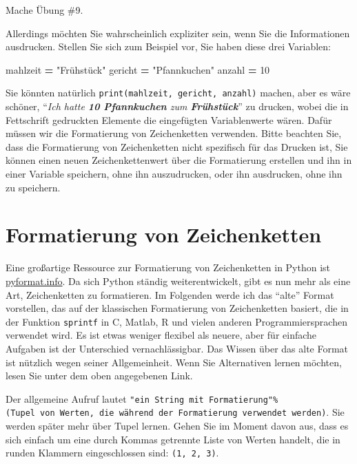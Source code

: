 \documentclass[
]{book}
\newenvironment{Shaded}{\begin{snugshade}}{\end{snugshade}}
\newcommand{\DecValTok}[1]{\textcolor[rgb]{0.00,0.00,0.81}{#1}}
\newcommand{\NormalTok}[1]{#1}
\newcommand{\OperatorTok}[1]{\textcolor[rgb]{0.81,0.36,0.00}{\textbf{#1}}}
\newcommand{\StringTok}[1]{\textcolor[rgb]{0.31,0.60,0.02}{#1}}
\begin{document}
Mache Übung \#9.

Allerdings möchten Sie wahrscheinlich expliziter sein, wenn Sie die Informationen ausdrucken. Stellen Sie sich zum Beispiel vor, Sie haben diese drei Variablen:

\begin{Shaded}
\begin{Highlighting}[]
\NormalTok{mahlzeit }\OperatorTok{=} \StringTok{"Frühstück"}
\NormalTok{gericht }\OperatorTok{=} \StringTok{"Pfannkuchen"}
\NormalTok{anzahl }\OperatorTok{=} \DecValTok{10}
\end{Highlighting}
\end{Shaded}

Sie könnten natürlich \texttt{print(mahlzeit,\ gericht,\ anzahl)} machen, aber es wäre schöner, ``\emph{Ich hatte \textbf{10 Pfannkuchen} zum \textbf{Frühstück}}'' zu drucken, wobei die in Fettschrift gedruckten Elemente die eingefügten Variablenwerte wären. Dafür müssen wir die Formatierung von Zeichenketten verwenden. Bitte beachten Sie, dass die Formatierung von Zeichenketten nicht spezifisch für das Drucken ist, Sie können einen neuen Zeichenkettenwert über die Formatierung erstellen und ihn in einer Variable speichern, ohne ihn auszudrucken, oder ihn ausdrucken, ohne ihn zu speichern.

\hypertarget{string-formatting}{%
\section{Formatierung von Zeichenketten}\label{string-formatting}}

Eine großartige Ressource zur Formatierung von Zeichenketten in Python ist \href{https://pyformat.info/}{pyformat.info}. Da sich Python ständig weiterentwickelt, gibt es nun mehr als eine Art, Zeichenketten zu formatieren. Im Folgenden werde ich das ``alte'' Format vorstellen, das auf der klassischen Formatierung von Zeichenketten basiert, die in der Funktion \texttt{sprintf} in C, Matlab, R und vielen anderen Programmiersprachen verwendet wird. Es ist etwas weniger flexibel als neuere, aber für einfache Aufgaben ist der Unterschied vernachlässigbar. Das Wissen über das alte Format ist nützlich wegen seiner Allgemeinheit. Wenn Sie Alternativen lernen möchten, lesen Sie unter dem oben angegebenen Link.

Der allgemeine Aufruf lautet \texttt{"ein\ String\ mit\ Formatierung"\%(Tupel\ von\ Werten,\ die\ während\ der\ Formatierung\ verwendet\ werden)}. Sie werden später mehr über Tupel lernen. Gehen Sie im Moment davon aus, dass es sich einfach um eine durch Kommas getrennte Liste von Werten handelt, die in runden Klammern eingeschlossen sind: \texttt{(1,\ 2,\ 3)}.
\end{document}
